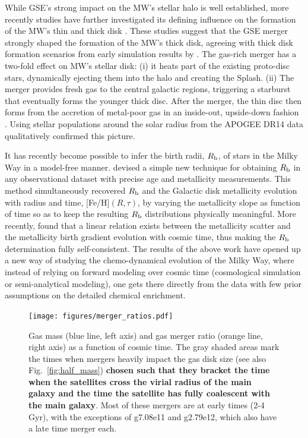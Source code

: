 \documentclass[useAMS,usenatbib]{mnras}
\begin{document}
While GSE's strong impact on the MW's stellar halo is well established, more recently studies have further investigated its defining influence on the formation of the MW's thin and thick disk \citep[e.g.][]{Grand2020,Ciuca2022,Orkney2022,Rey2023}. These studies suggest that the GSE merger strongly shaped the formation of the MW's thick disk, agreeing with thick disk formation scenarios from early simulation results by \cite{Brook2004, Brook2006}. The gas-rich merger has a two-fold effect on MW's stellar disk: (i) it heats part of the existing proto-disc stars, dynamically ejecting them into the halo and creating the Splash. (ii) The merger provides fresh gas to the central galactic regions, triggering a starburst \citep[potentially after first causing a pause in star formation;][]{Vincenzo2019} that eventually forms the younger thick disc. After the merger, the thin disc then forms from the accretion of metal-poor gas in an inside-out, upside-down fashion \citep[e.g.,][]{Bird2013, Minchev2013, Grand2018, Buck2020a}. Using stellar populations around the solar radius from the APOGEE DR14 data \citet{Ciuca2021} qualitatively confirmed this picture. 

It has recently become possible to infer the birth radii, $R_{\rm{b}}$, of stars in the Milky Way in a model-free manner. \cite{Minchev2018} devised a simple new technique for obtaining $R_{\rm{b}}$ in any observational dataset with precise age and metallicity measurements. This method simultaneously recovered $R_{\rm{b}}$ and the Galactic disk metallicity evolution with radius and time, [Fe/H]$(R,\tau)$, by varying the metallicity slope as function of time so as to keep the resulting $R_{\rm{b}}$ distributions physically meaningful. More recently, \cite{Lu2022b} found that a linear relation exists between the metallicity scatter and the metallicity birth gradient evolution with cosmic time, thus making the $R_{\rm{b}}$ determination fully self-consistent. The results of the above work have opened up a new way of studying the chemo-dynamical evolution of the Milky Way, where instead of relying on forward modeling over cosmic time (cosmological simulation or semi-analytical modeling), one gets there directly from the data with few prior assumptions on the detailed chemical enrichment.

\begin{figure}
    \begin{centering}
        \texttt{[image: figures/merger\_ratios.pdf]}
        \vspace*{-1.75em}
        \caption{Gas mass (blue line, left axis) and gas merger ratio (orange line, right axis) as a function of cosmic time. The gray shaded areas mark the times when mergers heavily impact the gas disk size (see also Fig.~\ref{fig:half_mass}) \textbf{chosen such that they bracket the time when the satellites cross the virial radius of the main galaxy and the time the satellite has fully coalescent with the main galaxy}. Most of these mergers are at early times (2-4 Gyr), with the exceptions of g7.08e11 and g2.79e12, which also have a late time merger each.}
        \label{fig:merger_ratio}
    \end{centering}
\end{figure}
\end{document}
